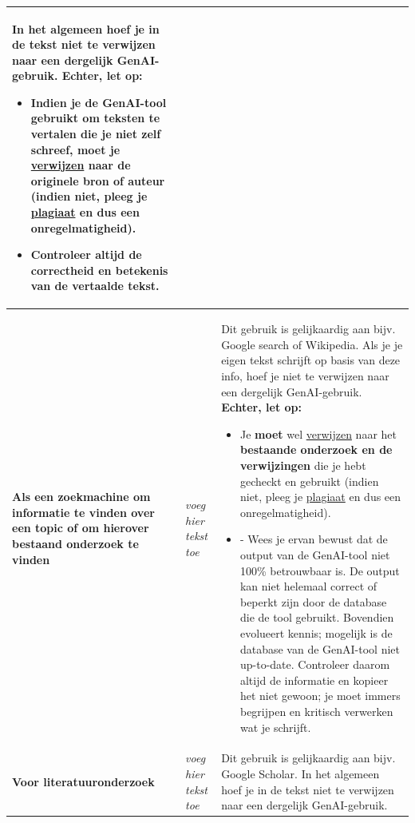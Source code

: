 \begin{longtable}{|p{}|p{}|p{}|}
In het algemeen hoef je in de tekst niet te verwijzen naar een dergelijk GenAI-gebruik.
\textbf{Echter, let op: } 
\begin{itemize}
    \item Indien je de GenAI-tool gebruikt om teksten te vertalen die je niet zelf schreef, \textbf{moet} je \href{https://bib.kuleuven.be/training-en-tutorials/citeren/basisprincipes}{verwijzen} naar \textbf{de originele bron of auteur} (indien niet, pleeg je \href{https://www.kuleuven.be/onderwijs/plagiaat/index}{plagiaat} en dus een onregelmatigheid).
    \item Controleer altijd de correctheid en betekenis van de vertaalde tekst.
\end{itemize} \\ \hline
\textbf{Als een zoekmachine om informatie te vinden over een topic of om hierover bestaand onderzoek te vinden} & \textit{voeg hier tekst toe} & Dit gebruik is gelijkaardig aan bijv. Google search of Wikipedia. Als je je eigen tekst schrijft op basis van deze info, hoef je niet te verwijzen naar een dergelijk GenAI-gebruik. 
\textbf{Echter, let op: }
\begin{itemize}
    \item Je \textbf{moet} wel \href{https://bib.kuleuven.be/training-en-tutorials/citeren/basisprincipes}{verwijzen} naar het \textbf{bestaande onderzoek en de verwijzingen} die je hebt gecheckt en gebruikt (indien niet, pleeg je \href{https://www.kuleuven.be/onderwijs/plagiaat/index}{plagiaat} en dus een onregelmatigheid).
    \item -	Wees je ervan bewust dat de output van de GenAI-tool niet 100\% betrouwbaar is. De output kan niet helemaal correct of beperkt zijn door de database die de tool gebruikt. Bovendien evolueert kennis; mogelijk is de database van de GenAI-tool niet up-to-date. Controleer daarom altijd de informatie en kopieer het niet gewoon; je moet immers begrijpen en kritisch verwerken wat je schrijft.
\end{itemize} \\ \hline
\textbf{Voor literatuuronderzoek} & \textit{voeg hier tekst toe} & Dit gebruik is gelijkaardig aan bijv. Google Scholar. In het algemeen hoef je in de tekst niet te verwijzen naar een dergelijk GenAI-gebruik.


\end{longtable}

